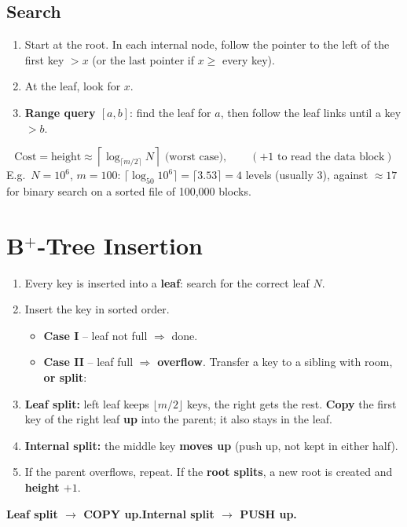 \documentclass[10pt,a4paper]{article}
\begin{document}
\subsection{Search}
\begin{enumerate}
  \item Start at the root. In each internal node, follow the pointer to the left of the first key $> x$ (or the last pointer if $x \ge$ every key).
  \item At the leaf, look for $x$.
  \item \textbf{Range query $[a,b]$}: find the leaf for $a$, then follow the leaf links until a key $> b$.
\end{enumerate}
\[
\text{Cost} = \text{height} \approx \left\lceil \log_{\lceil m/2 \rceil} N \right\rceil \text{ (worst case)}, \qquad (+1 \text{ to read the data block})
\]
E.g.\ $N=10^6$, $m=100$: $\lceil \log_{50} 10^6 \rceil = \lceil 3.53 \rceil = 4$ levels (usually 3), against $\approx 17$ for binary search on a sorted file of 100,000 blocks.

\section{B$^+$-Tree Insertion}

\begin{keybox}[Algorithm]
\begin{enumerate}
  \item Every key is inserted into a \textbf{leaf}: search for the correct leaf $N$.
  \item Insert the key in sorted order.
    \begin{itemize}
      \item \textbf{Case I} -- leaf not full $\Rightarrow$ done.
      \item \textbf{Case II} -- leaf full $\Rightarrow$ \textbf{overflow}. Transfer a key to a sibling with room, \textbf{or split}:
    \end{itemize}
  \item \textbf{Leaf split:} left leaf keeps $\lfloor m/2 \rfloor$ keys, the right gets the rest. \textbf{Copy} the first key of the right leaf \textbf{up} into the parent; it also stays in the leaf.
  \item \textbf{Internal split:} the middle key \textbf{moves up} (push up, not kept in either half).
  \item If the parent overflows, repeat. If the \textbf{root splits}, a new root is created and \textbf{height $+1$}.
\end{enumerate}
\textbf{Leaf split $\to$ COPY up.\quad Internal split $\to$ PUSH up.}
\end{keybox}
\end{document}
